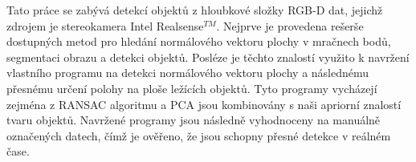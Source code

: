 \begin{abstract-czech}
    Tato práce se zabývá detekcí objektů z hloubkové složky RGB-D dat, jejichž zdrojem je stereokamera Intel\textregistered{} Realsense$^{TM}$. Nejprve je provedena rešerše dostupných metod pro hledání normálového vektoru plochy v mračnech bodů, segmentaci obrazu a detekci objektů. Posléze je těchto znalostí využito k navržení vlastního programu na detekci normálového vektoru plochy a následnému přesnému určení polohy na ploše ležících objektů. Tyto programy vycházejí zejména z RANSAC algoritmu a PCA jsou kombinovány s naši apriorní znalostí tvaru objektů. Navržené programy jsou následně vyhodnoceny na manuálně označených datech, čímž je ověřeno, že jsou schopny přesné detekce v reálném čase.
\end{abstract-czech}

